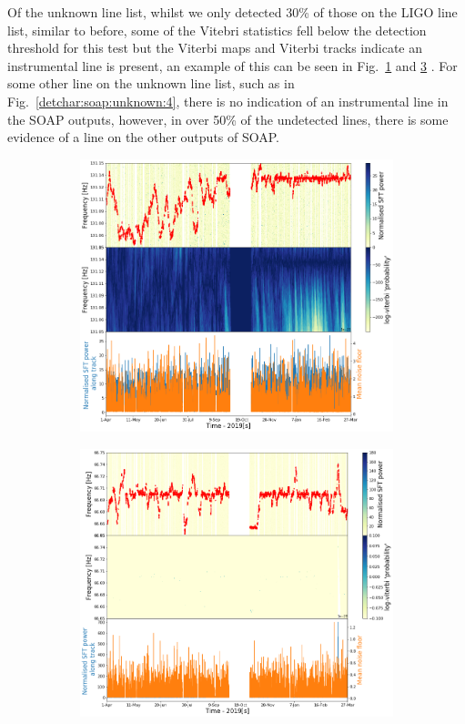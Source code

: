 Of the unknown line list, whilst we only detected 30\% of those on the \gls{LIGO} line list, similar to before, some of the Vitebri statistics fell below the detection threshold for this test but the Viterbi maps and Viterbi tracks indicate an instrumental line is present, an example of this can be seen in Fig.~\ref{detchar:soap:unknown:1} and \ref{detchar:soap:unknown:2} .
For some other line on the unknown line list, such as in Fig.~\ref{detchar:soap:unknown:4}, there is no indication of an instrumental line in the SOAP outputs, however, in over 50\% of the undetected lines, there is some evidence of a line on the other outputs of SOAP.
%
\begin{figure}[hpt]
	\centering
	\begin{subfigure}[h]{0.49\textwidth}
		\includegraphics[width=\textwidth]{C6_detchar/track_F131_05_131_15.png}
		\caption{\label{detchar:soap:unknown:1}}
	\end{subfigure}
	\begin{subfigure}[h]{0.49\textwidth}
		\includegraphics[width=\textwidth]{C6_detchar/track_F66_65_66_75.png}
		\caption{\label{detchar:soap:unknown:2}}
	\end{subfigure}
	

\end{figure}
